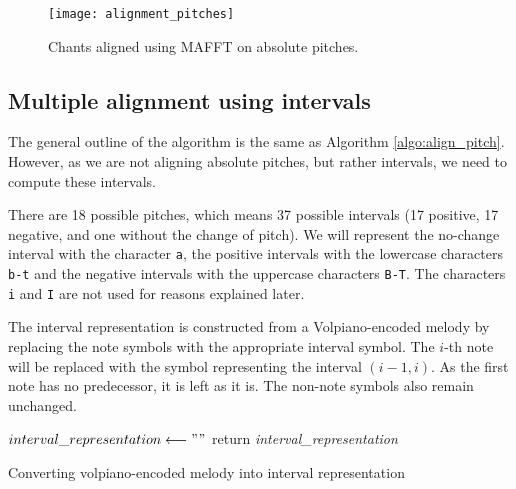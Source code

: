 \begin{figure}[h]
\centering
\texttt{[image: alignment\_pitches]}
\caption{Chants aligned using MAFFT on absolute pitches.}
\label{fig:align_pitches}
\end{figure}

\subsection{Multiple alignment using intervals}

The general outline of the algorithm is the same as Algorithm \ref{algo:align_pitch}. However, as we are not aligning absolute pitches, but rather intervals,
we need to compute these intervals.

There are 18 possible pitches, which means 37 possible intervals (17 positive, 17 negative, and one without the change of pitch). We will represent the no-change interval
with the character \verb|a|, the positive intervals with the lowercase characters \verb|b-t| and the negative intervals with the uppercase characters \verb|B-T|. The characters
\verb|i| and \verb|I| are not used for reasons explained later.

The interval representation is constructed from a Volpiano-encoded melody by replacing the note symbols with the appropriate interval symbol. The $i$-th note will be
replaced with the symbol representing the interval $(i-1, i)$. As the first note has no predecessor, it is left as it is. The non-note symbols also remain unchanged.\newline

\begin{algorithm}[H]
    \BlankLine
    $interval\_representation \longleftarrow ""$\;
    return \emph{interval\_representation}\;
    \caption{Converting volpiano-encoded melody into interval representation}
    \label{algo:convert_to_interval}
\end{algorithm}

